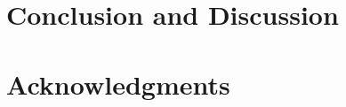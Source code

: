 \documentclass[10pt]{sigplanconf}
\begin{document}
\section{Conclusion and Discussion}\label{sec:conclusion}
%

\section*{Acknowledgments}



% 
% 
% 


\clearpage
\clearpage
\clearpage
\clearpage
\clearpage
\clearpage
\end{document}
